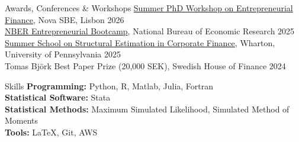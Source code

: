 \documentclass{resume}
\begin{document}
\begin{rSection}{Awards, Conferences \& Workshops}
  \vspace{-2pt}
  \href{https://entrepreneurial.finance/summer-phd-workshop/}{Summer PhD Workshop on Entrepreneurial Finance}, Nova SBE, Lisbon \hfill {2026} \\
  \href{https://www.nber.org/conferences/entrepreneurship-research-boot-camp-summer-2025}{NBER Entrepreneurial Bootcamp}, National Bureau of Economic Research \hfill {2025} \\
  \href{https://rodneywhitecenter.wharton.upenn.edu/2025-summer-school/}{Summer School on Structural Estimation in Corporate Finance}, Wharton, University of Pennsylvania \hfill {2025} \\
  Tomas Bj\"{o}rk Best Paper Prize (20,000 SEK), Swedish House of Finance \hfill {2024}
\end{rSection}


\begin{rSection}{Skills}
  \vspace{-2pt}
  {\bf Programming:} Python, R, Matlab, Julia, Fortran \\%
  {\bf Statistical Software:} Stata \\%
  {\bf Statistical Methods:} Maximum Simulated Likelihood, Simulated Method of Moments \\%
  {\bf Tools:} \LaTeX, Git, AWS
\end{rSection}
\end{document}
